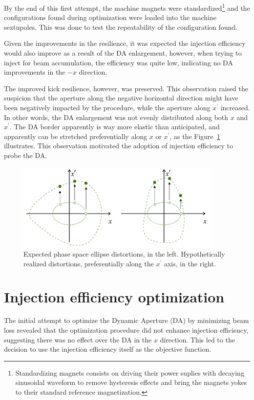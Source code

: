 By the end of this first attempt, the machine magnets were standardized\footnote{Standardizing magnets consists on driving their power suplies with decaying sinusoidal waveform to remove hysteresis effects and bring the magnets yokes to their standard reference magnetization.} and the configurations found during optimization were loaded into the machine sextupoles. This was done to test the repeatability of the configuration found.

Given the improvements in the resilience, it was expected the injection efficiency would also improve as a result of the DA enlargement, however, when trying to inject for beam accumulation, the efficiency was quite low, indicating no DA improvements in the $-x$ direction.

The improved kick resilience, however, was preserved. This observation raised the suspicion that the aperture along the negative horizontal direction might have been negatively impacted by the procedure, while the aperture along $x^\prime$ increased. In other words, the DA enlargement was not evenly distributed along both $x$ and $x^\prime$. The DA border apparently is way more elastic than anticipated, and apparently can be stretched preferentially along $x$ or $x^\prime$, as the Figure~\ref{fig:expected_vs_reality_DA} illustrates. This observation motivated the adoption of injection efficiency to probe the DA.
\begin{figure}[htb]
    \centering
    \includegraphics[width=0.9\textwidth]{Images/elastic_phase_space_distortion.pdf}
    \caption[Expected phase space ellipse distortions vs. hypothetically realized distortions.]{Expected phase space ellipse distortions, in the left. Hypothetically realized distortions, preferentially along the $x^\prime$ axis, in the right.}
    \label{fig:expected_vs_reality_DA}
\end{figure}
\section{Injection efficiency optimization}
\label{sec:injeff_opt}
The initial attempt to optimize the Dynamic Aperture (DA) by minimizing beam loss revealed that the optimization procedure did not enhance injection efficiency, suggesting there was no effect over the DA in the $x$ direction. This led to the decision to use the injection efficiency itself as the objective function.

